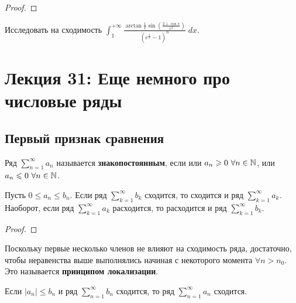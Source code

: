 	\begin{proof}
	\end{proof}
	
	\begin{example}
		Исследовать на сходимость $\displaystyle \int_1^{+\infty} \frac{\arctan{\frac{1}{x}}\sin{(\frac{2 + \cos{x}}{x^2})}}{(e^{\frac{1}{x}} - 1)^{\alpha}} \; dx$.
	\end{example}
	
	\newpage
	
	\section{Лекция 31: Еще немного про числовые ряды}
	
	\subsection{Первый признак сравнения}
	
	\begin{definition}
		Ряд $\sum_{n = 1}^{\infty} a_n$ называется \textbf{знакопостоянным}, если или
		$a_n \geqslant 0 \text{ } \forall n \in \mathbb N$, или $a_n \leqslant 0 \text{ } \forall n \in \mathbb N$.
	\end{definition}
	
	\begin{sentence}
		Пусть $0 \leqslant a_n \leqslant b_n$. Если ряд $\displaystyle \sum_{k = 1}^{\infty} b_k$ сходится, то сходится и ряд $\displaystyle \sum_{k = 1}^{\infty} a_k$. Наоборот, если ряд $\displaystyle \sum_{k = 1}^{\infty} a_k$ расходится, то расходится и ряд $\displaystyle \sum_{k = 1}^{\infty} b_k$.
	\end{sentence}
	
	\begin{proof}
	\end{proof}
	
	\begin{mention}
		Поскольку первые несколько членов не влияют на сходимость
		ряда, достаточно, чтобы неравенства выше выполнялись
		начиная с некоторого момента $\forall n > n_0$. Это называется
		\textbf{принципом локализации}.
	\end{mention}
	
	\begin{corollary}
		Если $|a_n| \leqslant b_n$ и ряд $\displaystyle \sum_{n = 1}^{\infty} b_n$ сходится, то ряд $\displaystyle \sum_{n = 1}^{\infty} a_n$ сходится.
	\end{corollary}
	
